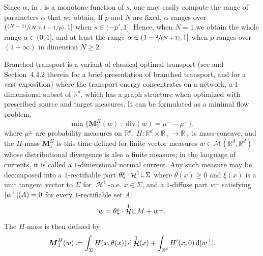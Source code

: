\documentclass[10pt]{amsart}
\newcommand{\spfrac}[2]{{\sfrac{#1}{(#2)}}}
\newcommand{\pspfrac}[2]{{\sfrac{(#1)}{(#2)}}}
\theoremstyle{plain}
\theoremstyle{definition}
\newcommand{\dd}{\mathop{}\mathopen{}\mathrm{d}}
\newcommand{\R}{\mathbb{R}}
\newcommand{\Mspace}{\mathscr{M}}
\newcommand{\mass}{\boldsymbol{M}}
\newcommand{\mres}{\mathop{\hbox{\vrule height 6pt width .5pt depth 0pt \vrule height .5pt width 4pt depth 0pt}}\nolimits}
\newcommand{\st}{\;:\;}
\DeclarePairedDelimiter{\abs}{\lvert}{\rvert}
\DeclareMathOperator{\hdm}{\mathcal{H}}
\begin{document}
Since $\alpha$, in , is a monotone function of $s$, one may easily compute the range of parameters $\alpha$ that we obtain. If $p$ and $N$ are fixed, $\alpha$ ranges over $\left(\pspfrac{N-1}{N+1-1/p}, 1\right]$ when $s\in (-p',1]$. Hence, when $N=1$ we obtain the whole range $\alpha \in (0,1]$, and at least the range $\alpha \in \left(1-\spfrac{2}{N+1},1\right]$ when $p$ ranges over $(1+\infty)$ in dimension $N\geq 2$.

\label{branchedTransport}

Branched transport is a variant of classical optimal transport (see \cite{santambrogioOptimalTransportApplied2015} and Section~4.4.2 therein for a brief presentation of branched transport, and \cite{bernotOptimalTransportationNetworks2009} for a vast exposition) where the transport energy concentrates on a network, \ie a \(1\)\nobreakdash-di\-mensional subset of \(\R^d\), which has a graph structure when optimized with prescribed source and target measures. It can be formulated as a minimal flow problem,
\[
\min\Big\{\mass_1^H(w)\st \mathrm{div}(w)=\mu^--\mu^+\Big\},
\]
where \(\mu^\pm\) are probability measures on \(\R^d\), \(H:\R^d\times\R_+\to\R_+\) is mass-concave, and the \(H\)-mass \(\mass_1^H\) is this time defined for finite vector measures $w \in \Mspace(\R^d,\R^d)$ whose distributional divergence is also a finite measure; in the language of currents, it is called a $1$-dimensional normal current. Any such measure may be decomposed into a $1$-rectifiable part $\theta\xi \cdot \hdm^1 \mres \Sigma$ where \(\theta(x)\geq 0\) and \(\xi(x)\) is a unit tangent vector to \(\Sigma\) for \(\hdm^1\)-a.e. \(x\in \Sigma\), and a $1$-diffuse part $w^\perp$ satisfying $\abs{w^\perp}(A) = 0$ for every $1$-rectifiable set $A$:
\[
w=\theta\xi\cdot\hdm^1 \mres M +w^\perp.
\]
The $H$-mass is then defined by:
\begin{equation}
\label{HmassVector}
\mass_1^H(w)\coloneqq\int_\Sigma H(x,\theta(x))\dd\hdm^1(x)+\int_{\R^d} H'(x,0)\dd\abs{w^\perp}.
\end{equation}
\end{document}

